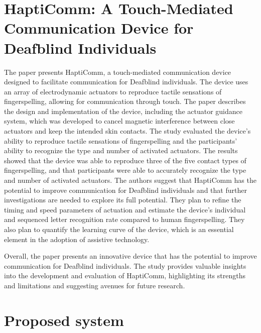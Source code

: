 \documentclass[12pt,a4paper]{report}
\begin{document}
\section{HaptiComm: A Touch-Mediated Communication Device for Deafblind Individuals }
The paper\cite{ref8} presents HaptiComm, a touch-mediated communication device designed to facilitate communication for Deafblind individuals. The device uses an array of electrodynamic actuators to reproduce tactile sensations of fingerspelling, allowing for communication through touch. The paper describes the design and implementation of the device, including the actuator guidance system, which was developed to cancel magnetic interference between close actuators and keep the intended skin contacts. The study evaluated the device's ability to reproduce tactile sensations of fingerspelling and the participants' ability to recognize the type and number of activated actuators. The results showed that the device was able to reproduce three of the five contact types of fingerspelling, and that participants were able to accurately recognize the type and number of activated actuators. The authors suggest that HaptiComm has the potential to improve communication for Deafblind individuals and that further investigations are needed to explore its full potential. They plan to refine the timing and speed parameters of actuation and estimate the device's individual and sequenced letter recognition rate compared to human fingerspelling. They also plan to quantify the learning curve of the device, which is an essential element in the adoption of assistive technology. 

Overall, the paper presents an innovative device that has the potential to improve communication for Deafblind individuals. The study provides valuable insights into the development and evaluation of HaptiComm, highlighting its strengths and limitations and suggesting avenues for future research.

\section{Proposed system}
\end{document}
